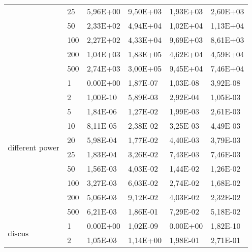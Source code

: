 \begin{longtable}[c]{|m{3.5cm}|l|l|l|l|l|}
                                        & 25        & 5,96E+00   & 9,50E+03   & 1,93E+03   & 2,60E+03  \\ \cline{2-6} 
                                        & 50        & 2,33E+02   & 4,94E+04   & 1,02E+04   & 1,13E+04  \\ \cline{2-6} 
                                        & 100       & 2,27E+02   & 4,33E+04   & 9,69E+03   & 8,61E+03  \\ \cline{2-6} 
                                        & 200       & 1,04E+03   & 1,83E+05   & 4,62E+04   & 4,59E+04  \\ \cline{2-6} 
                                        & 500       & 2,74E+03   & 3,00E+05   & 9,45E+04   & 7,46E+04  \\ \hline
\multirow{10}{*}{different power}       & 1         & 0.00E+00   & 1,87E-07   & 1,03E-08   & 3,92E-08  \\ \cline{2-6} 
                                        & 2         & 1,00E-10   & 5,89E-03   & 2,92E-04   & 1,05E-03  \\ \cline{2-6} 
                                        & 5         & 1,84E-06   & 1,27E-02   & 1,99E-03   & 2,61E-03  \\ \cline{2-6} 
                                        & 10        & 8,11E-05   & 2,38E-02   & 3,25E-03   & 4,49E-03  \\ \cline{2-6} 
                                        & 20        & 5,98E-04   & 1,77E-02   & 4,40E-03   & 3,79E-03  \\ \cline{2-6} 
                                        & 25        & 1,83E-04   & 3,26E-02   & 7,43E-03   & 7,46E-03  \\ \cline{2-6} 
                                        & 50        & 1,56E-03   & 4,03E-02   & 1,44E-02   & 1,26E-02  \\ \cline{2-6} 
                                        & 100       & 3,27E-03   & 6,03E-02   & 2,74E-02   & 1,68E-02  \\ \cline{2-6} 
                                        & 200       & 5,06E-03   & 9,12E-02   & 4,03E-02   & 2,32E-02  \\ \cline{2-6} 
                                        & 500       & 6,21E-03   & 1,86E-01   & 7,29E-02   & 5,18E-02  \\ \hline
\multirow{10}{*}{discus}                & 1         & 0.00E+00   & 1,02E-09   & 0.00E+00   & 1,82E-10  \\ \cline{2-6} 
                                        & 2         & 1,05E-03   & 1,14E+00   & 1,98E-01   & 2,71E-01  \\ \cline{2-6} 

\end{longtable}
